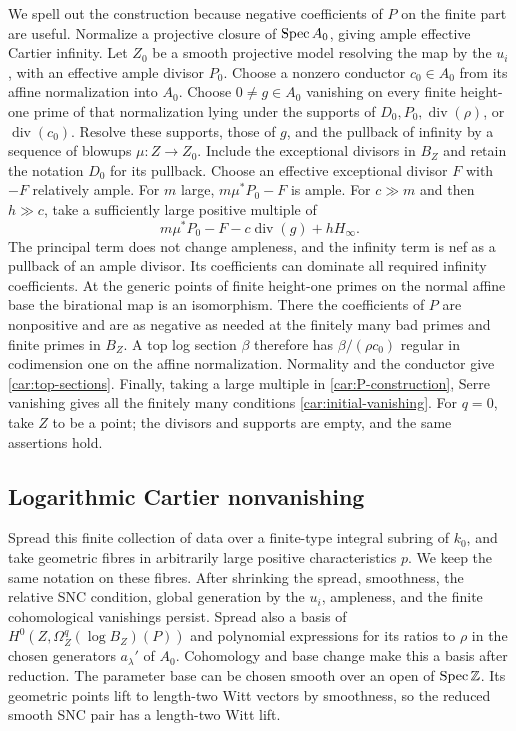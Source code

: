 We spell out the construction because negative coefficients of $P$
on the finite part are useful. Normalize a projective closure of
$\operatorname{Spec} A_0$, giving ample effective Cartier infinity. Let $Z_0$
be a smooth projective model resolving the map by the $u_i$, with
an effective ample divisor $P_0$. Choose a nonzero conductor
$c_0\in A_0$ from its affine normalization into $A_0$. Choose
$0\ne g\in A_0$ vanishing on every finite height-one prime of
that normalization lying under the supports of
$D_0,P_0,\operatorname{div}(\rho)$, or $\operatorname{div}(c_0)$.
Resolve these supports, those of $g$, and the pullback of infinity
by a sequence of blowups $\mu:Z\to Z_0$. Include the exceptional
divisors in $B_Z$ and retain the notation $D_0$ for its pullback.
Choose an effective exceptional divisor $F$ with $-F$ relatively
ample. For $m$ large, $m\mu^*P_0-F$ is ample. For $c\gg m$ and
then $h\gg c$, take a sufficiently large positive multiple of
\begin{equation}\label{car:P-construction}
 m\mu^*P_0-F-c\operatorname{div}(g)+hH_\infty.
\end{equation}
The principal term does not change ampleness, and the infinity
term is nef as a pullback of an ample divisor. Its coefficients
can dominate all required infinity coefficients. At the generic
points of finite height-one primes on the normal affine base the
birational map is an isomorphism. There the coefficients of $P$
are nonpositive and are as negative as needed at the finitely
many bad primes and finite primes in $B_Z$. A top log section
$\beta$ therefore has $\beta/(\rho c_0)$ regular in codimension
one on the affine normalization. Normality and the conductor
give \eqref{car:top-sections}. Finally, taking a large multiple
in \eqref{car:P-construction}, Serre vanishing gives all the
finitely many conditions \eqref{car:initial-vanishing}.
For $q=0$, take $Z$ to be a point; the divisors and supports are
empty, and the same assertions hold.

\subsection{Logarithmic Cartier nonvanishing}

Spread this finite collection of data over a finite-type integral
subring of $k_0$, and take geometric fibres in arbitrarily large
positive characteristics $p$. We keep the same notation on these
fibres. After shrinking the spread, smoothness, the relative SNC
condition, global generation by the $u_i$, ampleness, and the
finite cohomological vanishings persist. Spread also a basis of
$H^0(Z,\Omega_Z^q(\log B_Z)(P))$ and polynomial expressions for
its ratios to $\rho$ in the chosen generators $a_\lambda'$ of
$A_0$. Cohomology and base change make this a basis after
reduction. The parameter base can be chosen smooth over an open
of $\operatorname{Spec}\mathbb Z$. Its geometric points lift to length-two Witt
vectors by smoothness, so the reduced smooth SNC pair has a
length-two Witt lift.

